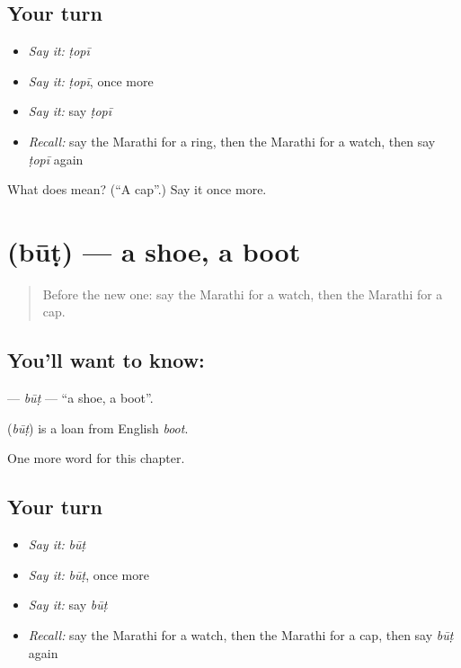 \subsection*{Your turn}
\begin{itemize}
\raggedright
  \item \emph{Say it:} \emph{ṭopī}
  \item \emph{Say it:} \emph{ṭopī}, once more
  \item \emph{Say it:} say \emph{ṭopī}
  \item \emph{Recall:} say the Marathi for a ring, then the Marathi for a watch, then say \emph{ṭopī} again
\end{itemize}

\begin{tcolorbox}[breakable,colback=teal!4,colframe=teal!35!black,title={Before you move on}]
What does  mean? (\textquotedblleft{}A cap\textquotedblright{}.) Say it once more.
\end{tcolorbox}
\section[\texorpdfstring{\mr{बूट} (būṭ)}{बूट (būṭ)}]{ (būṭ) — a shoe, a boot}

\label{lesson:MR-C117-but}



\begin{quote}
Before the new one: say the Marathi for a watch, then the Marathi for a cap.
\end{quote}

\subsection*{You'll want to know: }
\textbf{} — \emph{būṭ} — \textquotedblleft{}a shoe, a boot\textquotedblright{}.

\begin{cousinweb}
\textbf{} (\emph{būṭ}) is a loan from English \emph{boot}.
\end{cousinweb}

\begin{grammarlens}[title={What you've built}]
One more word for this chapter.
\end{grammarlens}

\subsection*{Your turn}
\begin{itemize}
\raggedright
  \item \emph{Say it:} \emph{būṭ}
  \item \emph{Say it:} \emph{būṭ}, once more
  \item \emph{Say it:} say \emph{būṭ}
  \item \emph{Recall:} say the Marathi for a watch, then the Marathi for a cap, then say \emph{būṭ} again
\end{itemize}

